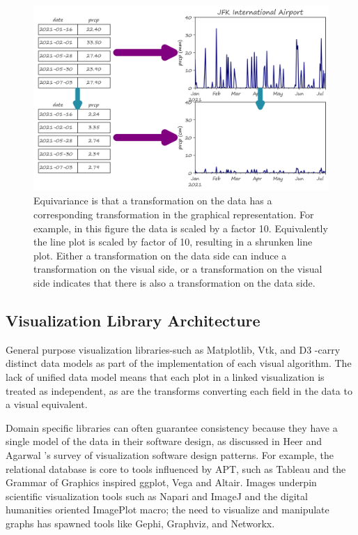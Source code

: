 \documentclass[10pt,journal,compsoc]{IEEEtran}
\theoremstyle{definition}
\theoremstyle{remark}
\begin{document}
\begin{figure}[h!]
  \label{fig:related-work:equivariance}
  \includegraphics[width=\columnwidth]{equiv.png}
  \caption{Equivariance is that a transformation on the data has a corresponding transformation in the graphical representation. For example, in this figure the data is scaled by a factor 10. Equivalently the line plot is scaled by factor of 10, resulting in a shrunken line plot. Either a transformation on the data side can induce a transformation on the visual side, or a transformation on the visual side indicates that there is also a transformation on the data side. }
\end{figure}

\subsection{Visualization Library Architecture}
General purpose visualization libraries-such as Matplotlib\cite{hunterMatplotlib2DGraphics2007}, Vtk\cite{hanwellVisualizationToolkitVTK2015,geveciVTK2012}, and D3 \cite{bostockDataDrivenDocuments2011}-carry distinct data models as part of the implementation of each visual algorithm. The lack of unified data model means that each plot in a linked\cite{beckerBrushingScatterplots1987,bujaInteractiveData1991} visualization is treated as independent, as are the transforms converting each field in the data to a visual equivalent.

Domain specific libraries can often guarantee consistency because they have a single model of the data in their software design, as discussed in Heer and Agarwal \cite{HeerSoftware2006}'s survey of visualization software design patterns. For example, the relational database is core to tools influenced by APT, such as Tableau\cite{StoltePolaris2002,hanrahanVizQL2006,MackinlayShowme2007} and the Grammar of Graphics\cite{wilkinsonGrammarGraphics2005} inspired ggplot\cite{wickhamGgplot2ElegantGraphics2016a}, Vega\cite{satyanarayanDeclarativeInteractionDesign2014} and Altair\cite{vanderplasAltairInteractiveStatistical2018}. Images underpin scientific visualization tools such as Napari\cite{nicholas_sofroniew_2021_4533308} and ImageJ\cite{schneiderNIHImageImageJ2012} and the digital humanities oriented ImagePlot\cite{studiesCulturevisImageplot2021} macro; the need to visualize and manipulate graphs has spawned tools like Gephi\cite{bastianGephiOpenSource2009}, Graphviz\cite{ellsonGraphvizOpenSource2002}, and Networkx\cite{HagbergExploringNetwork2008}. 
 
\end{document}
